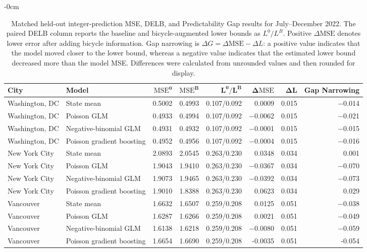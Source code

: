 \documentclass[applsci,article,accept,moreauthors]{Definitions/mdpi}
\begin{document}
\begin{table}[H]
\caption{Matched held-out integer-prediction MSE, DELB, and Predictability Gap results for July--December 2022. The paired DELB column reports the baseline and bicycle-augmented lower bounds as \(L^0/L^B\). Positive \(\Delta\mathrm{MSE}\) denotes lower error after adding bicycle information. Gap narrowing is \(\Delta G=\Delta\mathrm{MSE}-\Delta L\): a positive value indicates that the model moved closer to the lower bound, whereas a negative value indicates that the estimated lower bound decreased more than the model MSE. Differences were calculated from unrounded values and then rounded for display.}
\label{tab:prediction_gap_results}
\begin{adjustwidth}{-\extralength}{0cm}
\raggedleft
\begin{tabular*}{\linewidth}{@{\extracolsep{\fill}}llrrrrrr@{}}
\toprule
\textbf{City} & \textbf{Model} & \(\boldsymbol{\mathrm{MSE}^0}\) &
\(\boldsymbol{\mathrm{MSE}^B}\) & \(\boldsymbol{L^0/L^B}\) &
\(\boldsymbol{\Delta\mathrm{MSE}}\) &
\(\boldsymbol{\Delta L}\) & \textbf{Gap Narrowing}\\
\midrule
Washington, DC & State mean & {0.5002} & {0.4993} & 0.107/0.092 & {0.0009} & 0.015 & $-$0.014\\
Washington, DC & Poisson GLM & {0.4933} & {0.4994} & 0.107/0.092 & {$-$0.0062} & 0.015 & $-$0.021\\
Washington, DC & Negative-binomial GLM & {0.4931} & {0.4932} & 0.107/0.092 & {$-$0.0001} & 0.015 & $-$0.015\\
Washington, DC & Poisson gradient boosting & {0.4952} & {0.4956} & 0.107/0.092 & {$-$0.0004} & 0.015 & $-$0.016\\
New York City & State mean & {2.0893} & {2.0545} & 0.263/0.230 & {0.0348} & 0.034 & 0.001\\
New York City & Poisson GLM & {1.9043} & {1.9410} & 0.263/0.230 & {$-$0.0367} & 0.034 & $-$0.070\\
New York City & Negative-binomial GLM & {1.9073} & {1.9465} & 0.263/0.230 & {$-$0.0392} & 0.034 & $-$0.073\\
New York City & Poisson gradient boosting & {1.9010} & {1.8388} & 0.263/0.230 & {0.0623} & 0.034 & 0.029\\
Vancouver & State mean & {1.6632} & {1.6507} & 0.259/0.208 & {0.0125} & 0.051 & $-$0.038\\
Vancouver & Poisson GLM & {1.6287} & {1.6266} & 0.259/0.208 & {0.0021} & 0.051 & $-$0.049\\
Vancouver & Negative-binomial GLM & {1.6138} & {1.6218} & 0.259/0.208 & {$-$0.0080} & 0.051 & $-$0.059\\
Vancouver & Poisson gradient boosting & {1.6654} & {1.6690} & 0.259/0.208 & {-0.0035} & 0.051 & -0.054\\
\bottomrule
\end{tabular*}
\end{adjustwidth}
\end{table}
\end{document}
